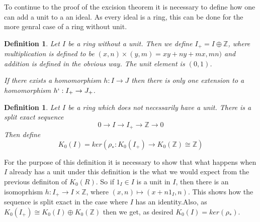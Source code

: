 \documentclass[a4paper,10pt]{article}
\newtheorem{defn}[thm]{Definition}
\begin{document}
To continue to the proof of the excision theorem it is necessary to define how one can add a unit to a an ideal. As every ideal is a ring, this can be done for the more genral case of a ring without unit.

\begin{defn}
Let $I$ be a ring without a unit. Then we define $I_{+}=I\oplus \mathbb{Z}$, where multiplication is defined to be $(x,n)\times (y,m)=xy+ny+mx,mn)$ and addition is defined in the obvious way. The unit element is $(0,1)$.

If there exists a homomorphism $h:I\rightarrow J$ then there is only one extension to a homomorphism $h`:I_{+}\rightarrow J_{+}$.
\end{defn}

\begin{defn}
Let $I$ be a ring which does not necessarily have a unit. There is a split exact sequence $$0\rightarrow I\rightarrow I_{+}\rightarrow \mathbb{Z}\rightarrow 0$$
Then define $$K_{0}(I)=ker(\rho_{*}:K_{0}(I_{+})\rightarrow K_{0}(\mathbb{Z})\cong\mathbb{Z})$$
\end{defn}

For the purpose of this definition it is necessary to show that what happens when $I$ already has a unit under this definition is the what we would expect from the previous definiton of $K_{0}(R)$. So if $1_{I}\in I$ is a unit in $I$, then there is an isomoprhism $h:I_{+}\rightarrow I\times \mathbb{Z}$, where $(x,n)\mapsto (x+n1_{I},n)$. This shows how the sequence is split exact in the case where $I$ has an identity.Also, as $K_{0}(I_{+})\cong K_{0}(I)\oplus K_{0}(\mathbb{Z})$ then we get, as desired $K_{0}(I)=ker(\rho_{*})$.
\end{document}

